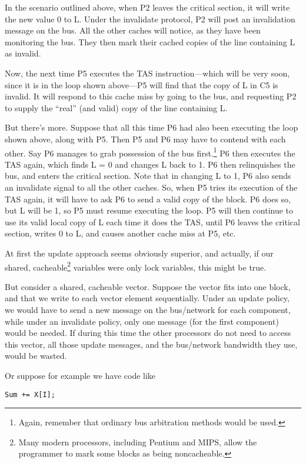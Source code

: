 In the scenario outlined above, when P2 leaves the critical section, it
will write the new value 0 to L. Under the invalidate protocol, P2 will
post an invalidation message on the bus. All the other caches will
notice, as they have been monitoring the bus. They then mark their
cached copies of the line containing L as invalid.

Now, the next time P5 executes the TAS instruction---which will be very
soon, since it is in the loop shown above---P5 will find that the copy
of L in C5 is invalid. It will respond to this cache miss by going to
the bus, and requesting P2 to supply the ``real'' (and valid) copy of
the line containing L.

But there's more.  Suppose that all this time P6 had also been executing
the loop shown above, along with P5.  Then P5 and P6 may have to contend
with each other.  Say P6 manages to grab possession of the bus
first.\footnote{Again, remember that ordinary bus arbitration methods
would be used.} P6 then executes the TAS again, which finds L = 0 and
changes L back to 1.  P6 then relinquishes the bus, and enters the
critical section.  Note that in changing L to 1, P6 also sends an
invalidate signal to all the other caches.  So, when P5 tries its
execution of the TAS again, it will have to ask P6 to send a valid copy
of the block.  P6 does so, but L will be 1, so P5 must resume executing
the loop. P5 will then continue to use its valid local copy of L each
time it does the TAS, until P6 leaves the critical section, writes 0 to
L, and causes another cache miss at P5, etc.

At first the update approach seems obviously superior, and actually, if
our shared, cacheable\footnote{ Many modern processors, including
Pentium and MIPS, allow the programmer to mark some blocks as being
noncacheable.} variables were only lock variables, this might be true.

But consider a shared, cacheable vector. Suppose the vector fits into
one block, and that we write to each vector element sequentially. Under
an update policy, we would have to send a new message on the bus/network
for each component, while under an invalidate policy, only one message
(for the first component) would be needed. If during this time the other
processors do not need to access this vector, all those update messages,
and the bus/network bandwidth they use, would be wasted.

Or suppose for example we have code like

\begin{Verbatim}[fontsize=\relsize{-2}]
Sum += X[I];
\end{Verbatim}

